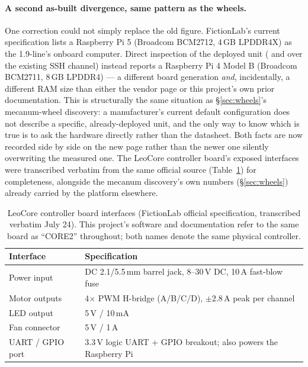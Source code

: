 \paragraph{A second as-built divergence, same pattern as the wheels.} One
correction could not simply replace the old figure. FictionLab's current
specification lists a Raspberry Pi 5 (Broadcom BCM2712, 4\,GB LPDDR4X) as
the 1.9-line's onboard computer. Direct inspection of the deployed unit
( and  over the existing SSH
channel) instead reports a Raspberry Pi 4 Model B (Broadcom BCM2711,
$8$\,GB LPDDR4) — a different board generation \emph{and}, incidentally, a
different RAM size than either the vendor page or this project's own prior
documentation. This is structurally the same situation as
\S\ref{sec:wheels}'s mecanum-wheel discovery: a manufacturer's current
default configuration does not describe a specific, already-deployed unit,
and the only way to know which is true is to ask the hardware directly
rather than the datasheet. Both facts are now recorded side by side on the
new page rather than the newer one silently overwriting the measured one.
The LeoCore controller board's exposed interfaces were transcribed
verbatim from the same official source (Table~\ref{tab:leocore}) for
completeness, alongside the mecanum discovery's own numbers
(\S\ref{sec:wheels}) already carried by the platform elsewhere.

\begin{table}[htbp]
\centering
\small
\caption{LeoCore controller board interfaces (FictionLab official
specification, transcribed verbatim July 24). This project's software and
documentation refer to the same board as ``CORE2'' throughout; both names
denote the same physical controller.}
\label{tab:leocore}
\begin{tabular}{@{}ll@{}}
\toprule
Interface & Specification \\
\midrule
Power input & DC 2.1/5.5\,mm barrel jack, 8--30\,V DC, 10\,A fast-blow fuse \\
Motor outputs & 4$\times$ PWM H-bridge (A/B/C/D), $\pm2.8$\,A peak per channel \\
LED output & 5\,V / 10\,mA \\
Fan connector & 5\,V / 1\,A \\
UART / GPIO port & 3.3\,V logic UART + GPIO breakout; also powers the Raspberry Pi \\
\bottomrule
\end{tabular}
\end{table}

